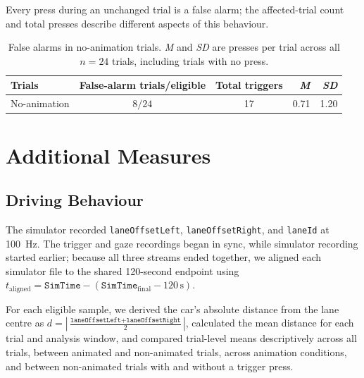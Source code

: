 \documentclass[
english,                 %
bibtex,                  %
includeExtraAbstracts, %
]{kththesis}
\newenvironment{evidenceblock}{\par\addvspace{6pt}\noindent\begin{minipage}{\linewidth}}{\end{minipage}\par\addvspace{6pt}}
\numberwithin{listing}{chapter}
\begin{document}
\begin{evidenceblock}
\normalsize
Every press during an unchanged trial is a false alarm; the affected-trial count and total presses describe different aspects of this behaviour.

\begin{table}[H]
\centering
\scriptsize
\caption[False alarms in no-animation trials]{False alarms in no-animation trials. \textit{M} and \textit{SD} are presses per trial across all $n = 24$ trials, including trials with no press.}
\label{tab:rq1-nt-false-alarms}
\setlength{\tabcolsep}{3pt}
\renewcommand{\arraystretch}{1.15}
\begin{tabularx}{\textwidth}{@{}>{\raggedright\arraybackslash}X c c r r@{}}
\toprule
Trials & False-alarm trials/eligible & Total triggers & \textit{M} & \textit{SD} \\
\midrule
No-animation & $8/24$ & 17 & 0.71 & 1.20 \\
\bottomrule
\end{tabularx}
\end{table}
\end{evidenceblock}

\section{Additional Measures}
\label{app:lane-details}

\subsection{Driving Behaviour}
\label{sec:driving-behaviour}

The simulator recorded \texttt{laneOffsetLeft}, \texttt{laneOffsetRight}, and \texttt{laneId} at 100~Hz. The trigger and gaze recordings began in sync, while simulator recording started earlier; because all three streams ended together, we aligned each simulator file to the shared 120-second endpoint using \(t_{\mathrm{aligned}} = \texttt{SimTime} - (\texttt{SimTime}_{\mathrm{final}} - 120\,\mathrm{s})\).

For each eligible sample, we derived the car’s absolute distance from the lane centre as \(d = \left|\frac{\texttt{laneOffsetLeft} + \texttt{laneOffsetRight}}{2}\right|\), calculated the mean distance for each trial and analysis window, and compared trial-level means descriptively across all trials, between animated and non-animated trials, across animation conditions, and between non-animated trials with and without a trigger press.
\end{document}
